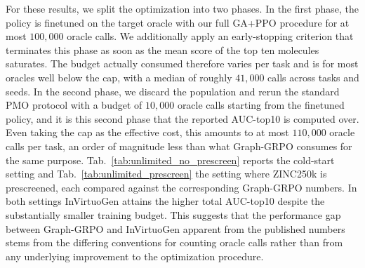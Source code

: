 \documentclass{article} %
\begin{document}
For these results, we split the optimization into two phases. In the first phase, the policy is finetuned on the target oracle with our full GA+PPO procedure for at most $100{,}000$ oracle calls. We additionally apply an early-stopping criterion that terminates this phase as soon as the mean score of the top ten molecules saturates. The budget actually consumed therefore varies per task and is for most oracles well below the cap, with a median of roughly $41{,}000$ calls across tasks and seeds. In the second phase, we discard the population and rerun the standard PMO protocol with a budget of $10{,}000$ oracle calls starting from the finetuned policy, and it is this second phase that the reported AUC-top10 is computed over. Even taking the cap as the effective cost, this amounts to at most $110{,}000$ oracle calls per task, an order of magnitude less than what Graph-GRPO consumes for the same purpose. Tab.~\ref{tab:unlimited_no_prescreen} reports the cold-start setting and Tab.~\ref{tab:unlimited_prescreen} the setting where ZINC250k is prescreened, each compared against the corresponding Graph-GRPO numbers. In both settings InVirtuoGen attains the higher total AUC-top10 despite the substantially smaller training budget. This suggests that the performance gap between Graph-GRPO and InVirtuoGen apparent from the published numbers stems from the differing conventions for counting oracle calls rather than from any underlying improvement to the optimization procedure.
\end{document}
